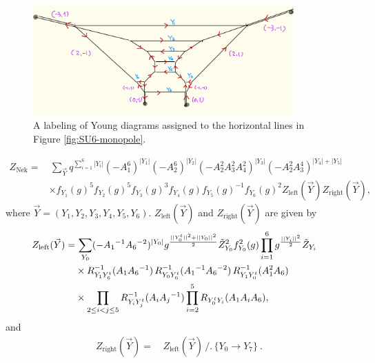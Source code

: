 \documentclass[11pt,a4paper]{article}
\newcommand{\nn}{\nonumber}
\begin{document}
\begin{figure}[t]
\centering
\includegraphics[width=10cm]{SU6young.jpeg}
\caption{A labeling of Young diagrams assigned to the horizontal lines in Figure \ref{fig:SU6-monopole}.}
\label{fig:SU6young}
\end{figure}

\begin{align}
Z_{\text{Nek}} 
=&\, \sum_{\vec{Y}}q^{\sum_{i=1}^6|Y_i|} (-A_1^6)^{|Y_1|}(-A_2^6)^{|Y_2|}(-A_2^2A_3^2A_4^2)^{|Y_3|}(-A_2^2A_3^4)^{|Y_4| + |Y_5|}\nn\\
&\times f_{Y_1}(g)^5f_{Y_2}(g)^5f_{Y_3}(g)^3f_{Y_4}(g)f_{Y_5}(g)^{-1}f_{Y_6}(g)^{2}Z_{\text{left}}(\vec{Y})Z_{\text{right}}(\vec{Y}), \label{Znek1}
\end{align}
where $\vec{Y}=(Y_1, Y_2, Y_3, Y_4, Y_5, Y_6)$.
$Z_{\text{left}}(\vec{Y})$ and $Z_{\text{right}}(\vec{Y})$ are given by
\begin{align}
Z_{\text{left}}(\vec{Y})=& \,
\sum_{Y_0} ( - A_1{}^{-1} A_6{}^{-2})^{|Y_0|} 
g^{\frac{||Y_0^t||^2+||Y_0||^2}{2}} \tilde{Z}_{Y_0}^2 f_{Y_0}^2(g)
\prod_{i=1}^6 g^{\frac{||Y_i||^2}{2}} \tilde{Z}_{Y_i} 
\cr 
& 
\times 
R_{Y_1 Y_6^t}^{-1} (A_1 A_6{}^{-1})\,R_{Y_0 Y_6^t}^{-1} (A_1{}^{-1} A_6{}^{-2})\,R_{Y_1Y_0^t }^{-1} (A_1^2A_6) \cr 
& 
\times  
 \prod_{2 \le i <  j \le 5} R_{Y_i Y_j^t}^{-1} (A_i A_j{}^{-1})
 \prod_{i=2}^5 R_{Y_0^t Y_i} (A_1 A_i  A_6) ,
\end{align}
and
\begin{align}
Z_{\text{right}}(\vec{Y})=&\, Z_{\text{left}}(\vec{Y})\,/.\,\{Y_0 \to Y_7 \}~.
\end{align}
\end{document}
